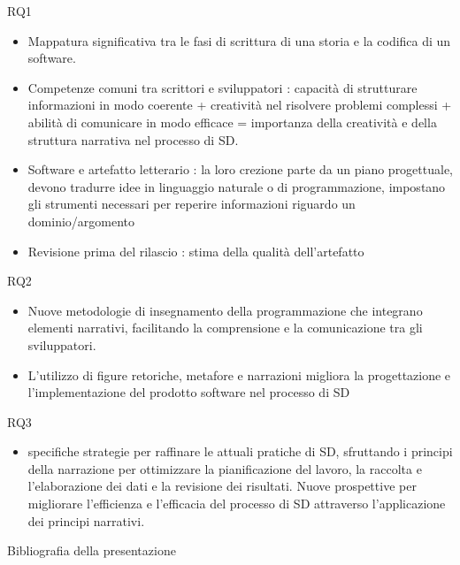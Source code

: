 \documentclass{beamer}
\begin{document}
\begin{frame}[t]{\centerline{RQ1}}
  \begin{itemize}
      \item Mappatura significativa tra le fasi di scrittura di una storia e la codifica di un software. 
      \item Competenze comuni tra scrittori e sviluppatori : capacità di strutturare informazioni in modo coerente + creatività nel risolvere problemi complessi + abilità di comunicare in modo efficace = importanza della creatività e della struttura narrativa nel processo di SD. 
      \item Software e artefatto letterario : la loro crezione parte da un piano progettuale, devono tradurre idee in linguaggio naturale o di programmazione, impostano gli strumenti necessari per reperire informazioni riguardo un dominio/argomento
      \item Revisione prima del rilascio : stima della qualità dell'artefatto
  \end{itemize}
  \vspace{0.5cm}
  \centering
\citet{hermans2017programming}
\end{frame}


\begin{frame}[t]{\centerline{RQ2}}
  \begin{itemize}
\item Nuove metodologie di insegnamento della programmazione che integrano elementi narrativi, facilitando la comprensione e la comunicazione tra gli sviluppatori. 
\item L'utilizzo di figure retoriche, metafore e narrazioni migliora la progettazione e l'implementazione del prodotto software nel processo di SD
  \end{itemize}

\end{frame}


\begin{frame}[t]{\centerline{RQ3}}
  \begin{itemize}
\item specifiche strategie per raffinare le attuali pratiche di SD, sfruttando i principi della narrazione per ottimizzare la pianificazione del lavoro, la raccolta e l'elaborazione dei dati e la revisione dei risultati. Nuove prospettive per migliorare l'efficienza e l'efficacia del processo di SD attraverso l'applicazione dei principi narrativi.
  \end{itemize}

\end{frame}


\tiny
\begin{frame}{\centerline{Bibliografia della presentazione}}
\begin{multicols}{2}


\end{multicols}
\end{frame}
\end{document}
